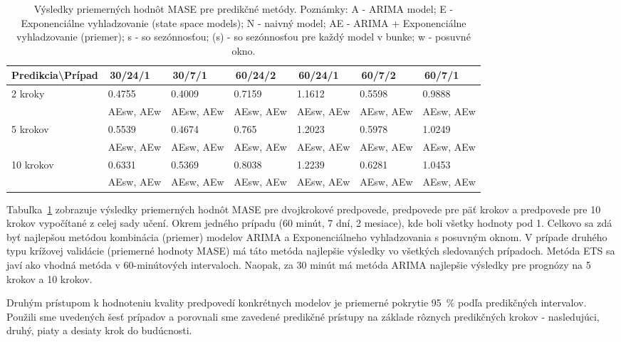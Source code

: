 \documentclass[thesismargins, thesislinespacing, openright, upjsfrontpage, combineabstracts]{rnthesis}
\begin{document}
\begin{table}[h]
    \centering
    \footnotesize 
    \singlespacing 
    \begin{tabular}{|p{3cm}|p{1.5cm}|p{1.5cm}|p{1.5cm}|p{1.5cm}|p{1.5cm}|p{1.5cm}|} \hline
        Predikcia\textbackslash Prípad & \,30/24/1\, & \,30/7/1\, & \,60/24/2\, & \,60/24/1\, & \,60/7/2\, & \,60/7/1\, \\    
        \hline\hline
       \multirow{2}{*}{2 kroky} & 0.4755 & 0.4009 & 0.7159 & 1.1612 & 0.5598 & 0.9888 \\
       & AEsw, AEw & AEsw, AEw & AEsw, AEw & AEsw, AEw & AEsw, AEw & AEsw, AEw  \\
        \hline
        \multirow{2}{*}{5 krokov} & 0.5539 & 0.4674 & 0.765 & 1.2023 & 0.5978 & 1.0249 \\
        & AEsw, AEw & AEsw, AEw & AEsw, AEw & AEsw, AEw & AEsw, AEw & AEsw, AEw  \\
        \hline
        \multirow{2}{*}{10 krokov} & 0.6331 & 0.5369 & 0.8038 & 1.2239 & 0.6281 & 1.0453 \\
        & AEsw, AEw & AEsw, AEw & AEsw, AEw & AEsw, AEw & AEsw, AEw & AEsw, AEw  \\
        \hline     
    \end{tabular}
    \caption{Výsledky priemerných hodnôt MASE pre predikčné metódy. Poznámky: A - ARIMA model; E - Exponenciálne vyhladzovanie (state space models); N - naivný model; AE - ARIMA + Exponenciálne vyhladzovanie (priemer); s - so sezónnosťou; (s) - so sezónnosťou pre každý model v bunke; w - posuvné okno.}
    \label{tab:mase}
\end{table}

Tabuľka~\ref{tab:mase} zobrazuje výsledky priemerných hodnôt MASE pre dvojkrokové predpovede, predpovede pre päť krokov a predpovede pre 10 krokov vypočítané z celej sady učení. Okrem jedného prípadu (60 minút, 7 dní, 2 mesiace), kde boli všetky hodnoty pod 1. Celkovo sa zdá byť najlepšou metódou kombinácia (priemer) modelov ARIMA a Exponenciálneho vyhladzovania s posuvným oknom. V prípade druhého typu krížovej validácie (priemerné hodnoty MASE) má táto metóda najlepšie výsledky vo všetkých sledovaných prípadoch. Metóda ETS sa javí ako vhodná metóda v 60-minútových intervaloch. Naopak, za 30 minút má metóda ARIMA najlepšie výsledky pre prognózy na 5 krokov a 10 krokov.


Druhým prístupom k hodnoteniu kvality predpovedí konkrétnych modelov je priemerné pokrytie 95~\% podľa predikčných intervalov. Použili sme uvedených šesť prípadov a porovnali sme zavedené predikčné prístupy na základe rôznych predikčných krokov - nasledujúci, druhý, piaty a desiaty krok do budúcnosti.
\end{document}
